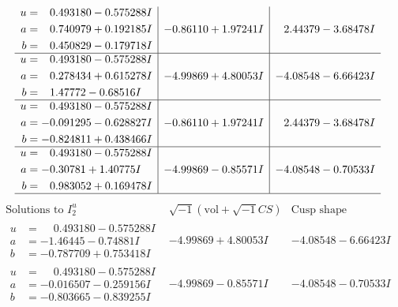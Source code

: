 \documentclass[1p]{elsarticle_modified}
\theoremstyle{definition}
\newcommand{\I}{\sqrt{-1}}
\begin{document}
$$\begin{array}{c|c|c}
\begin{aligned}
u &= \phantom{-}0.493180 - 0.575288 I \\
a &= \phantom{-}0.740979 + 0.192185 I \\
b &= \phantom{-}0.450829 - 0.179718 I\end{aligned}
 & -0.86110 + 1.97241 I & \phantom{-}2.44379 - 3.68478 I \\ \hline\begin{aligned}
u &= \phantom{-}0.493180 - 0.575288 I \\
a &= \phantom{-}0.278434 + 0.615278 I \\
b &= \phantom{-}1.47772 - 0.68516 I\end{aligned}
 & -4.99869 + 4.80053 I & -4.08548 - 6.66423 I \\ \hline\begin{aligned}
u &= \phantom{-}0.493180 - 0.575288 I \\
a &= -0.091295 - 0.628827 I \\
b &= -0.824811 + 0.438466 I\end{aligned}
 & -0.86110 + 1.97241 I & \phantom{-}2.44379 - 3.68478 I \\ \hline\begin{aligned}
u &= \phantom{-}0.493180 - 0.575288 I \\
a &= -0.30781 + 1.40775 I \\
b &= \phantom{-}0.983052 + 0.169478 I\end{aligned}
 & -4.99869 - 0.85571 I & -4.08548 - 0.70533 I\\
 \hline 
 \end{array}$$\newpage$$\begin{array}{c|c|c}  
\text{Solutions to }I^u_{2}& \I (\text{vol} + \sqrt{-1}CS) & \text{Cusp shape}\\
 \hline 
\begin{aligned}
u &= \phantom{-}0.493180 - 0.575288 I \\
a &= -1.46445 - 0.74881 I \\
b &= -0.787709 + 0.753418 I\end{aligned}
 & -4.99869 + 4.80053 I & -4.08548 - 6.66423 I \\ \hline\begin{aligned}
u &= \phantom{-}0.493180 - 0.575288 I \\
a &= -0.016507 - 0.259156 I \\
b &= -0.803665 - 0.839255 I\end{aligned}
 & -4.99869 - 0.85571 I & -4.08548 - 0.70533 I \\ \hline\begin{aligned}

\end{aligned}
\end{array}$$
\end{document}

